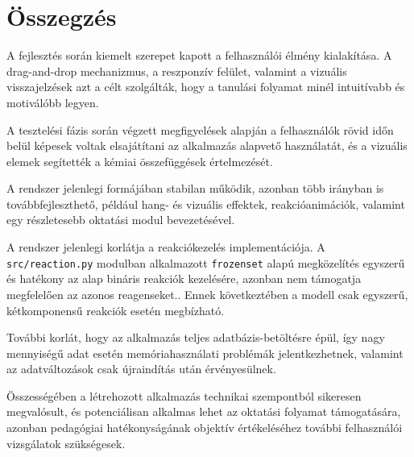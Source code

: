 \documentclass[]{thesis-ekf}
\begin{document}
	\chapter{Összegzés}
	
	A fejlesztés során kiemelt szerepet kapott a felhasználói élmény kialakítása. A drag-and-drop mechanizmus, a reszponzív felület, valamint a vizuális visszajelzések azt a célt szolgálták, hogy a tanulási folyamat minél intuitívabb és motiválóbb legyen.
	
	A tesztelési fázis során végzett megfigyelések alapján a felhasználók rövid időn belül képesek voltak elsajátítani az alkalmazás alapvető használatát, és a vizuális elemek segítették a kémiai összefüggések értelmezését.
	
	A rendszer jelenlegi formájában stabilan működik, azonban több irányban is továbbfejleszthető, például hang- és vizuális effektek, reakcióanimációk, valamint egy részletesebb oktatási modul bevezetésével.
	
	A rendszer jelenlegi korlátja a reakciókezelés implementációja. A \texttt{src/reaction.py} modulban alkalmazott \texttt{frozenset} alapú megközelítés egyszerű és hatékony az alap bináris reakciók kezelésére, azonban nem támogatja megfelelően az azonos reagenseket.. Ennek következtében a modell csak egyszerű, kétkomponensű reakciók esetén megbízható.
	
	További korlát, hogy az alkalmazás teljes adatbázis-betöltésre épül, így nagy mennyiségű adat esetén memóriahasználati problémák jelentkezhetnek, valamint az adatváltozások csak újraindítás után érvényesülnek.
	
	Összességében a létrehozott alkalmazás technikai szempontból sikeresen megvalósult, és potenciálisan alkalmas lehet az oktatási folyamat támogatására, azonban pedagógiai hatékonyságának objektív értékeléséhez további felhasználói vizsgálatok szükségesek.
	
\end{document}
